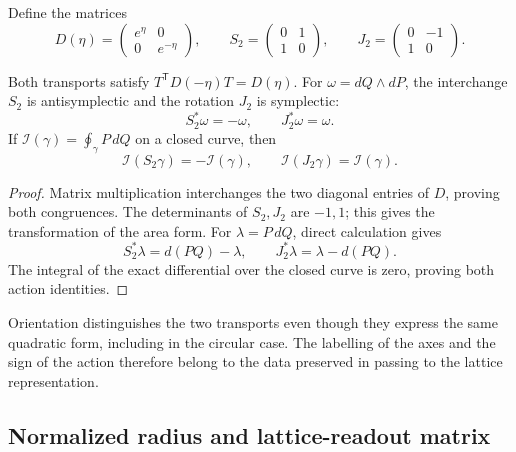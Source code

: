 Define the matrices
\begin{equation}
 D(\eta)=\begin{pmatrix}e^\eta&0\\0&e^{-\eta}\end{pmatrix},
 \qquad
 S_2=\begin{pmatrix}0&1\\1&0\end{pmatrix},
 \qquad
 J_2=\begin{pmatrix}0&-1\\1&0\end{pmatrix}.
 \label{x_reciprocidad:iv:ellipse:transportes}
\end{equation}

\begin{proposition}
\label{x_reciprocidad:iv:ellipse:accion-reciproca}
Both transports satisfy
\(T^{\mathsf T}D(-\eta)T=D(\eta)\).
For \(\omega=dQ\wedge dP\), the interchange \(S_2\) is
antisymplectic and the rotation \(J_2\) is symplectic:
\[
 S_2^*\omega=-\omega,\qquad J_2^*\omega=\omega.
\]
If \(\mathcal I(\gamma)=\oint_\gamma P\,dQ\) on a
closed curve, then
\begin{equation}
 \mathcal I(S_2\gamma)=-\mathcal I(\gamma),\qquad
 \mathcal I(J_2\gamma)=\mathcal I(\gamma).
 \label{x_reciprocidad:iv:ellipse:signos-accion}
\end{equation}
\end{proposition}
\begin{proof}
Matrix multiplication interchanges the two diagonal entries
of \(D\), proving both congruences.
The determinants of \(S_2,J_2\) are \(-1,1\);
this gives the transformation of the area form.
For \(\lambda=P\,dQ\), direct calculation gives
\[
 S_2^*\lambda=d(PQ)-\lambda,\qquad
 J_2^*\lambda=\lambda-d(PQ).
\]
The integral of the exact differential over the closed curve
is zero, proving both action identities.
\end{proof}

Orientation distinguishes the two transports even though they express
the same quadratic form, including in the circular case.
The labelling of the axes and the sign of the action therefore belong
to the data preserved in passing to the
lattice representation.

\subsection{Normalized radius and lattice-readout matrix}
\label{x_reciprocidad:iv:ellipse:radio}

